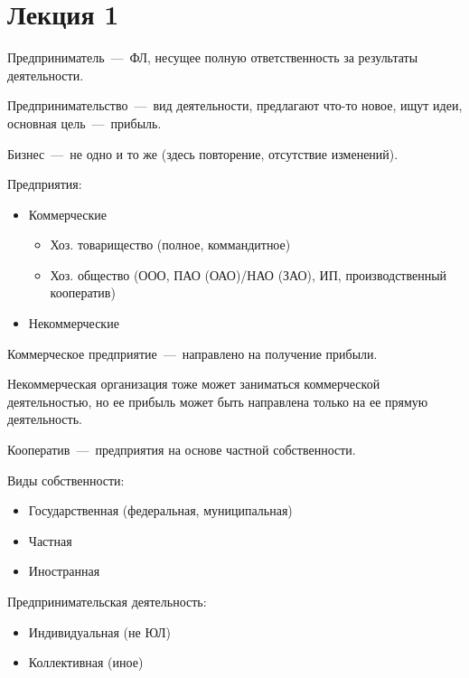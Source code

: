 \documentclass[14pt]{extarticle}
\begin{document}
\title{}
\maketitle

\section{Лекция 1}

Предприниматель~---~ФЛ, несущее полную ответственность за результаты деятельности.

Предпринимательство~---~вид деятельности, предлагают что-то новое, ищут идеи, основная цель~---~прибыль.

Бизнес~---~не одно и то же (здесь повторение, отсутствие изменений).

Предприятия:

\begin{itemize}
	\item Коммерческие
	\begin{itemize}
		\item Хоз. товарищество (полное, коммандитное)
		\item Хоз. общество (ООО, ПАО (ОАО)/НАО (ЗАО), ИП, производственный кооператив)
	\end{itemize}
	\item Некоммерческие
\end{itemize}

Коммерческое предприятие~---~направлено на получение прибыли. 

Некоммерческая организация тоже может заниматься коммерческой деятельностью, но ее прибыль может быть направлена только на ее прямую деятельность. 

Кооператив~---~предприятия на основе частной собственности.

Виды собственности:

\begin{itemize}
	\item Государственная (федеральная, муниципальная)
	\item Частная
	\item Иностранная
\end{itemize}

Предпринимательская деятельность:

\begin{itemize}
	\item Индивидуальная (не ЮЛ)
	\item Коллективная (иное)
\end{itemize}
\end{document}
